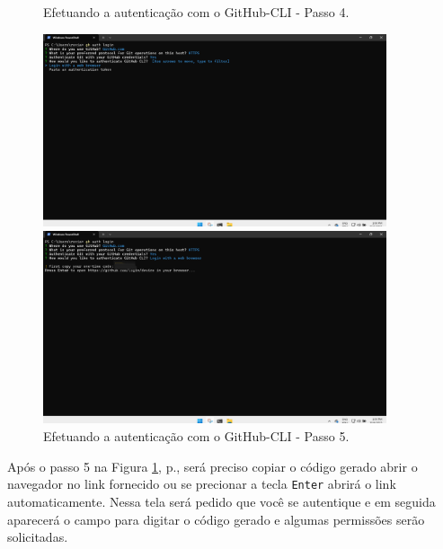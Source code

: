 \begin{figure}[H]
  \centering
  \caption{Efetuando a autenticação com o GitHub-CLI - Passo 4.}
  \label{fig:gh_auth_login_3}
  \includegraphics[width=0.9\textwidth]{./assets/images/13_3_gh_auth_login.png}
  \caption{Efetuando a autenticação com o GitHub-CLI - Passo 5.}
  \label{fig:gh_auth_login_4}
  \includegraphics[width=0.9\textwidth]{./assets/images/13_4_gh_auth_login.png}
\end{figure}
\par
Após o passo 5 na Figura \ref{fig:gh_auth_login_4}, p.\pageref{fig:gh_auth_login_4}, será preciso copiar o código gerado abrir o navegador no link fornecido ou se precionar a tecla \texttt{Enter} abrirá o link automaticamente. Nessa tela será pedido que você se autentique e em seguida aparecerá o campo para digitar o código gerado e algumas permissões serão solicitadas.
